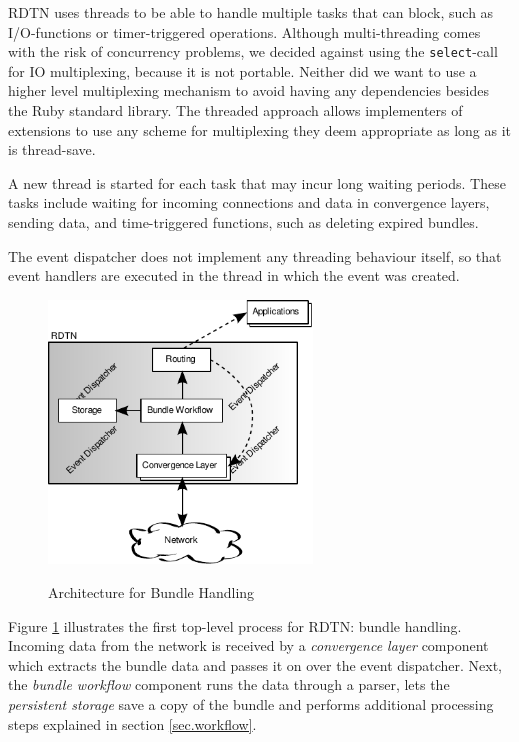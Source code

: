 \documentclass[a4paper]{article}
\begin{document}
RDTN uses threads to be able to handle multiple tasks that can block, such as
I/O-functions or timer-triggered operations. Although multi-threading comes with
the risk of concurrency problems, we decided against using the {\tt select}-call
for IO multiplexing, because it is not portable. Neither did we want to use a
higher level multiplexing mechanism to avoid having any dependencies besides the
Ruby standard library. The threaded approach allows implementers of extensions
to use any scheme for multiplexing they deem appropriate as long as it is
thread-save.

A new thread is started for each task that may incur long waiting periods. These
tasks include waiting for incoming connections and data in convergence layers,
sending data, and time-triggered functions, such as deleting expired bundles.

The event dispatcher does not implement any threading behaviour itself, so that
event handlers are executed in the thread in which the event was created.\\

\begin{figure}[h]
\begin{center}
\includegraphics[height=7cm]{bundle-architecture.pdf}\\
\caption{\label{fig.bundle-arch} Architecture for Bundle Handling}
\end{center}
\end{figure}

Figure \ref{fig.bundle-arch} illustrates the first top-level process for RDTN:
bundle handling. Incoming data from the network is received by a {\em
convergence layer} component which extracts the bundle data and passes it on
over the event dispatcher. Next, the {\em bundle workflow} component runs the
data through a parser, lets the {\em persistent storage} save a copy of the
bundle and performs additional processing steps explained in section
\ref{sec.workflow}.
\end{document}
